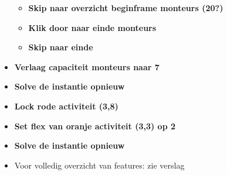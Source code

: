 \documentclass[a4paper]{article}
\begin{document}
\begin{itemize}
\begin{itemize}
		\item \textbf{Skip naar overzicht beginframe monteurs (20?)}
		\item \textbf{Klik door naar einde monteurs}
		\item \textbf{Skip naar einde}
	\end{itemize}
	\item \textbf{Verlaag capaciteit monteurs naar 7}
	\item \textbf{Solve de instantie opnieuw}
	\item \textbf{Lock rode activiteit (3,8)}
	\item \textbf{Set flex van oranje activiteit (3,3) op 2}
	\item \textbf{Solve de instantie opnieuw}
	\item Voor volledig overzicht van features: zie verslag
\end{itemize}
\end{document}
